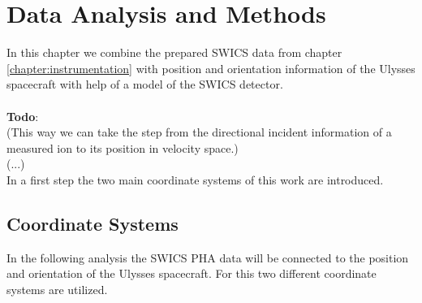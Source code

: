 
\chapter{Data Analysis and Methods} %

\label{chapter:data} 





In this chapter we combine the prepared SWICS data from chapter \ref{chapter:instrumentation} with position and orientation information of the Ulysses spacecraft with help of a model of the SWICS detector. \\ \\
\textbf{Todo}: \\(This way we can take the step from the directional incident information of a measured ion to its position in velocity space.) \\
(...)\\
In a first step the two main coordinate systems of this work are introduced.

\section{Coordinate Systems}
\label{sec:cs}
In the following analysis the SWICS PHA data will be connected to the position and orientation of the Ulysses spacecraft. For this two different coordinate systems are utilized.

%
